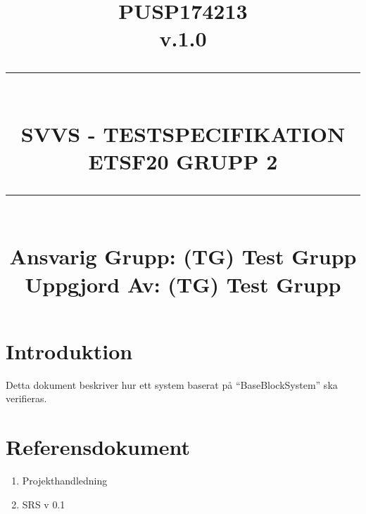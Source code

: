 \documentclass[paper=a4, fontsize=11pt,twoside]{article}
\title{
		\documentNumber{#1}																						
		\documentVersion{#2}																				
		\HRule{0.5pt} \\ %
		\LARGE \textbf{\uppercase{#3}} \\
		\large \textbf{\uppercase{ETSF20 Grupp 2}} 
		\HRule{2pt} \\ [1.5cm]    
		\normalsize            
		\documentResponsible{#4} \\ 
		\documentCreator{#4}  
	}
\newcommand{\HRule}[1]{\rule{\linewidth}{#1}}
\newcommand{\documentNumber}[1]{\centering PUSP1742#1 \\[1.0cm]}
\newcommand{\documentVersion}[1]{\centering \small{v.#1} \\[1.0cm]}
\newcommand{\documentResponsible}[1]{\centering  Ansvarig Grupp: #1}
\newcommand{\documentCreator}[1]{\centering Uppgjord Av: #1}
\newcommand{\grouptitlepage}[4]{ 
	\title{
		\documentNumber{#1}																						
		\documentVersion{#2}																				
		\HRule{0.5pt} \\ %
		\LARGE \textbf{\uppercase{#3}} \\
		\large \textbf{\uppercase{ETSF20 Grupp 2}} 
		\HRule{2pt} \\ [1.5cm]    
		\normalsize            
		\documentResponsible{#4} \\ 
		\documentCreator{#4}  
	}																							
	\maketitle																							
	\thispagestyle{empty} 																					
	\newpage 
}
\begin{document}
\grouptitlepage
{13}
{1.0}
{SVVS - Testspecifikation}
{(TG) Test Grupp} %
\tableofcontents
\section{Introduktion}

 Detta dokument beskriver hur ett system baserat på “BaseBlockSystem”
 ska verifieras.
 

\section{Referensdokument}

\begin{enumerate}
\item Projekthandledning
\item SRS v 0.1
\end{enumerate}
\end{document}
